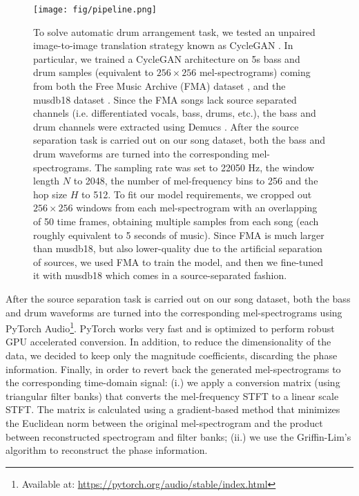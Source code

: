 \documentclass[journal]{IEEEtran}
\begin{document}

\begin{figure*}
\begin{center}
\texttt{[image: fig/pipeline.png]}
\end{center}
\caption{To solve automatic drum arrangement task, we tested an unpaired image-to-image translation strategy known as CycleGAN \cite{zhu2017unpaired}. In particular, we trained a CycleGAN architecture on 5s bass and drum samples (equivalent to $256\times256$ mel-spectrograms) coming from both the Free Music Archive (FMA) dataset \cite{fma_challenge}, and the musdb18 dataset \cite{musdb18}. Since the FMA songs lack source separated channels (i.e. differentiated vocals, bass, drums, etc.), the bass and drum channels were extracted using Demucs \cite{defossez2019demucs}. After the source separation task is carried out on our song dataset, both the bass and drum waveforms are turned into the corresponding mel-spectrograms. The sampling rate was set to 22050 Hz, the window length $N$ to 2048, the number of mel-frequency bins to 256 and the hop size $H$ to 512. To fit our model requirements, we cropped out $256\times256$ windows from each mel-spectrogram with an overlapping of 50 time frames, obtaining multiple samples from each song (each roughly equivalent to 5 seconds of music). Since FMA is much larger than musdb18, but also lower-quality due to the artificial separation of sources, we used FMA to train the model, and then we fine-tuned it with musdb18 which comes in a source-separated fashion.}
\label{fig:Mel_SP}
\end{figure*}

After the source separation task is carried out on our song dataset, both the bass and drum waveforms are turned into the corresponding mel-spectrograms using PyTorch Audio\footnote{Available at: \url{https://pytorch.org/audio/stable/index.html}}. PyTorch works very fast and is optimized to perform robust GPU accelerated conversion. In addition, to reduce the dimensionality of the data, we decided to keep only the magnitude coefficients, discarding the phase information. Finally, in order to revert back the generated mel-spectrograms to the corresponding time-domain signal: (i.) we apply a conversion matrix (using triangular filter banks) that converts the mel-frequency STFT to a linear scale STFT. The matrix is calculated using a gradient-based method \cite{gradient_mel} that minimizes the Euclidean norm between the original mel-spectrogram and the product between reconstructed spectrogram and filter banks; (ii.) we use the Griffin-Lim's algorithm \cite{griffin_lim} to reconstruct the phase information.
\end{document}
